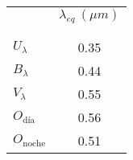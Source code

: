 \documentclass[12pt,a4paper]{practice}
\begin{document}
\begin{problem}
\begin{solution}
            \begin{table}[h!]
                \centering
                \begin{tabular}{ l c }
                    \cline{2-2}
                      & $\lambda_{eq}\ (\mu m)$
                    \rule{0pt}{2.6ex}\rule[-1.2ex]{0pt}{0pt}\\
                     & \\[-1.05em]\hline
                     & \\[-1.05em]
                    $U_{\lambda}$  & 0.35 \\
                    $B_{\lambda}$  & 0.44 \\
                    $V_{\lambda}$  & 0.55 \\
                    $O_{\textrm{día}}$  & 0.56 \\
                    $O_{\textrm{noche}}$  & 0.51 \\
                    \hline
                \end{tabular}
            \end{table}
        \end{solution}
    \end{problem}
\end{document}
